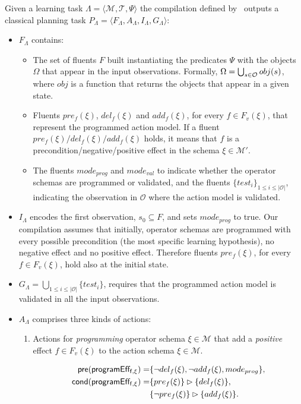 \documentclass[letterpaper]{article} %
\newcommand{\tup}[1]{{\langle #1 \rangle}}
\newcommand{\pre}{\mathsf{pre}}     %
\newcommand{\cond}{\mathsf{cond}}   %
\begin{document}
Given a learning task $\Lambda=\tup{\mathcal{M},\mathcal{T},\Psi}$ the compilation defined by~\citeauthor{aineto:learningSTRIPS:ICAPS2018} outputs a classical planning task $P_{\Lambda}=\tup{F_{\Lambda},A_{\Lambda},I_{\Lambda},G_{\Lambda}}$:
\begin{itemize}
\item $F_{\Lambda}$ contains:
\begin{itemize}
\item The set of fluents $F$ built instantiating the predicates $\Psi$ with the objects $\Omega$ that appear in the input observations. Formally, $\Omega=\bigcup_{\small s\in\mathcal{O}} obj(s)$, where $obj$ is a function that returns the objects that appear in a given state.
\item Fluents $pre_f(\xi)$, $del_f(\xi)$ and $add_f(\xi)$, for every $f\in F_v(\xi)$, that represent the programmed action model. If a fluent $pre_f(\xi)/del_f(\xi)/add_f(\xi)$ holds, it means that $f$ is a precondition/negative/positive effect in the schema $\xi\in \mathcal{M}'$. 
\item The fluents $mode_{prog}$ and $mode_{val}$ to indicate whether the operator schemas are programmed or validated, and the fluents $\{test_i\}_{1\leq i\leq |\mathcal{O}|}$, indicating the observation in $\mathcal{O}$ where the action model is validated.
\end{itemize}
\item $I_{\Lambda}$ encodes the first observation, $s_0\subseteq F$, and sets $mode_{prog}$ to true. Our compilation assumes that initially, operator schemas are programmed with every possible precondition (the most specific learning hypothesis), no negative effect and no positive effect. Therefore fluents $pre_f(\xi)$, for every $f\in F_v(\xi)$, hold also at the initial state.

\item $G_{\Lambda}=\bigcup_{1\leq i\leq |\mathcal{O}|}\{test_i\}$, requires that the programmed action model is validated in all the input observations.
\item $A_{\Lambda}$ comprises three kinds of actions:
\begin{enumerate}
\item Actions for {\em programming} operator schema $\xi\in\mathcal{M}$ that add a {\em positive} effect $f\in F_v(\xi)$ to the action schema $\xi\in\mathcal{M}$.
\begin{small}
\begin{align*}
\hspace*{7pt}\pre(\mathsf{programEff_{f,\xi}})=&\{\neg del_{f}(\xi),\neg add_{f}(\xi), mode_{prog}\},\\
\cond(\mathsf{programEff_{f,\xi}})=&\{pre_{f}(\xi)\}\rhd\{del_{f}(\xi)\},\\
& \{\neg pre_{f}(\xi)\}\rhd\{add_{f}(\xi)\}.
\end{align*}
\end{small}


\end{enumerate}
\end{itemize}
\end{document}
